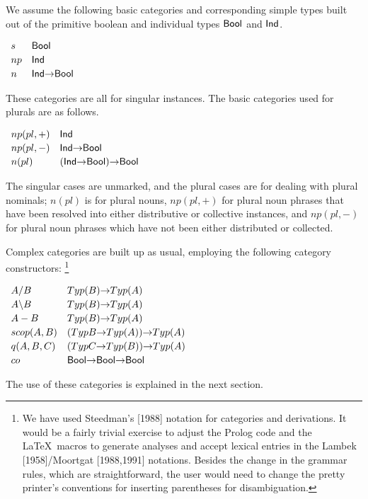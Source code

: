 We assume the following basic categories and corresponding simple
types built out of the primitive boolean and individual types
$\mbox{\sf Bool}$ and $\mbox{\sf Ind}$.
%
\begin{center}
$
\begin{array}{ll}
s  &  \mbox{\sf Bool} \\[2pt]
np &  \mbox{\sf Ind} \\[2pt]
n  &  \mbox{\sf Ind}{\rightarrow}\mbox{\sf Bool} 
\end{array}
$
\end{center}
%
These categories are all for singular instances.  The basic categories used
for plurals are as follows.
%
\begin{center}
$
\begin{array}{ll}
np(pl,+)  & \mbox{\sf Ind} \\[2pt]
np(pl,-)  & \mbox{\sf Ind}{\rightarrow}\mbox{\sf Bool} \\[2pt]
n(pl)     & (\mbox{\sf Ind}{\rightarrow}\mbox{\sf Bool}){\rightarrow}\mbox{\sf Bool}
\end{array}
$
\end{center}
%
The singular cases are unmarked, and the plural cases are for dealing
with plural nominals;  $n(pl)$ is for plural nouns, $np(pl,+)$ for
plural noun phrases that have been resolved into either distributive
or collective instances, and $np(pl,-)$ for plural noun phrases which
have not been either distributed or collected.

Complex categories are built up as usual, employing the following
category constructors:%
%
\footnote{We have used Steedman's [1988] notation for categories and
derivations.  It would be a fairly trivial exercise to adjust the
Prolog code and the \LaTeX\ macros to generate analyses and accept
lexical entries in the Lambek [1958]/Moortgat [1988,1991] notations.
Besides the change in the grammar rules, which are straightforward,
the user would need to change the pretty printer's conventions for
inserting parentheses for disambiguation.}
%
\begin{center}
$
\begin{array}{ll}
A / B  &  Typ(B){\rightarrow}Typ(A) \\[2pt]
A \backslash B  &  Typ(B){\rightarrow}Typ(A) \\[2pt]
A-B        &  Typ(B){\rightarrow}Typ(A) \\[2pt]
scop(A,B)  &  (Typ{B}{\rightarrow}Typ(A)){\rightarrow}Typ(A) \\[2pt]
q(A,B,C)   &  (Typ{C}{\rightarrow}Typ(B)){\rightarrow}Typ(A) \\[2pt]
co         &  \mbox{\sf Bool}{\rightarrow}\mbox{\sf Bool}{\rightarrow}\mbox{\sf Bool} 
\end{array}
$
\end{center}
%
The use of these categories is explained in the next section.



